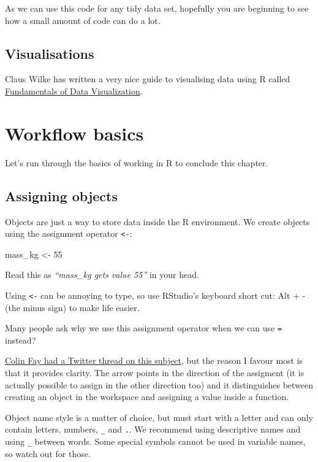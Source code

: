 \documentclass[12pt,]{book}
\newenvironment{Shaded}{\begin{snugshade}}{\end{snugshade}}
\newcommand{\DecValTok}[1]{\textcolor[rgb]{0.00,0.00,0.81}{#1}}
\newcommand{\StringTok}[1]{\textcolor[rgb]{0.31,0.60,0.02}{#1}}
\newcommand{\NormalTok}[1]{#1}
\theoremstyle{definition}
\theoremstyle{definition}
\theoremstyle{definition}
\theoremstyle{remark}
\begin{document}
As we can use this code for any tidy data set, hopefully you are
beginning to see how a small amount of code can do a lot.

\subsection{Visualisations}\label{visualisations}

Claus Wilke has written a very nice guide to visualising data using R
called \href{http://serialmentor.com/dataviz/index.html}{Fundamentals of
Data Visualization}.

\section{Workflow basics}\label{workflow-basics}

Let's run through the basics of working in R to conclude this chapter.

\subsection{Assigning objects}\label{assigning-objects}

Objects are just a way to store data inside the R environment. We create
objects using the assignment operator \texttt{\textless{}-}:

\begin{Shaded}
\begin{Highlighting}[]
\NormalTok{mass_kg <-}\StringTok{ }\DecValTok{55}
\end{Highlighting}
\end{Shaded}

Read this as \emph{``mass\_kg gets value 55''} in your head.

Using \texttt{\textless{}-} can be annoying to type, so use RStudio's
keyboard short cut: Alt + - (the minus sign) to make life easier.

Many people ask why we use this assignment operator when we can use
\texttt{=} instead?

\href{https://twitter.com/_colinfay/status/1006139974377443328}{Colin
Fay had a Twitter thread on this subject}, but the reason I favour most
is that it provides clarity. The arrow points in the direction of the
assigment (it is actually possible to assign in the other direction too)
and it distinguishes between creating an object in the workspace and
assigning a value inside a function.

Object name style is a matter of choice, but must start with a letter
and can only contain letters, numbers, \texttt{\_} and \texttt{.}. We
recommend using descriptive names and using \texttt{\_} between words.
Some special symbols cannot be used in variable names, so watch out for
those.
\end{document}
